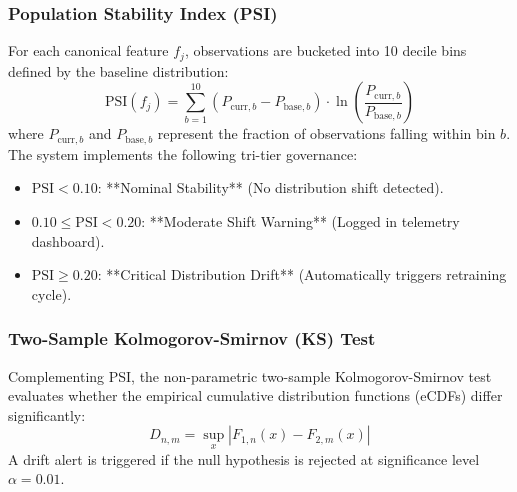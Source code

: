 \subsubsection{Population Stability Index (PSI)}
For each canonical feature $f_j$, observations are bucketed into 10 decile bins defined by the baseline distribution:
\begin{equation}
\text{PSI}(f_j) = \sum_{b=1}^{10} \left( P_{\text{curr}, b} - P_{\text{base}, b} \right) \cdot \ln\left( \frac{P_{\text{curr}, b}}{P_{\text{base}, b}} \right)
\end{equation}
where $P_{\text{curr}, b}$ and $P_{\text{base}, b}$ represent the fraction of observations falling within bin $b$. The system implements the following tri-tier governance:
\begin{itemize}[leftmargin=*]
    \item $\text{PSI} < 0.10$: **Nominal Stability** (No distribution shift detected).
    \item $0.10 \le \text{PSI} < 0.20$: **Moderate Shift Warning** (Logged in telemetry dashboard).
    \item $\text{PSI} \ge 0.20$: **Critical Distribution Drift** (Automatically triggers retraining cycle).
\end{itemize}

\subsubsection{Two-Sample Kolmogorov-Smirnov (KS) Test}
Complementing PSI, the non-parametric two-sample Kolmogorov-Smirnov test evaluates whether the empirical cumulative distribution functions (eCDFs) differ significantly:
\begin{equation}
D_{n, m} = \sup_x \left| F_{1, n}(x) - F_{2, m}(x) \right|
\end{equation}
A drift alert is triggered if the null hypothesis is rejected at significance level $\alpha = 0.01$.
